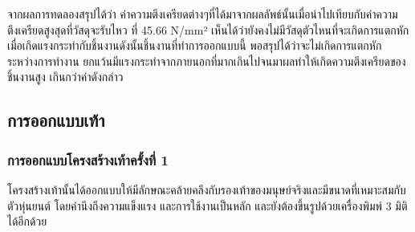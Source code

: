 จากผลการทดลองสรุปได้ว่า ค่าความตึงเครียดต่างๆที่ได้มาจากผลลัพธ์นั้นเมื่อนำไปเทียบกับค่าความตึงเครียดสูงสุดที่วัสดุจะรับไหว
ที่ 45.66 N/mm² เห็นได้ว่ายังคงไม่มีวัสดุตัวไหนที่จะเกิดการแตกหักเมื่อเกิดแรงกระทำกับชิ้นงานดังนั้นชิ้นงานที่ทำการออกแบบนี้
พอสรุปได้ว่าจะไม่เกิดการแตกหักระหว่างการทำงาน ยกแว้นมีแรงกระทำจากภายนอกที่มากเกินไปจนมาผลทำให้เกิดความตึงเครียดของชิ้นงานสูง
เกินกว่าค่าดังกล่าว  

\subsection{การออกแบบเท้า}
\subsubsection{การออกแบบโครงสร้างเท้าครั้งที่ 1}
โครงสร้างเท้านั้นได้ออกแบบให้มีลักษณะคล้ายคลึงกับรองเท้าของมนุษย์จริงและมีขนาดที่เหมาะสมกับตัวหุ่นยนต์ โดยคำนึงถึงความแข็งแรง
และการใช้งานเป็นหลัก และยังต้องขึ้นรูปด้วยเครื่องพิมพ์ 3 มิติได้อีกด้วย
